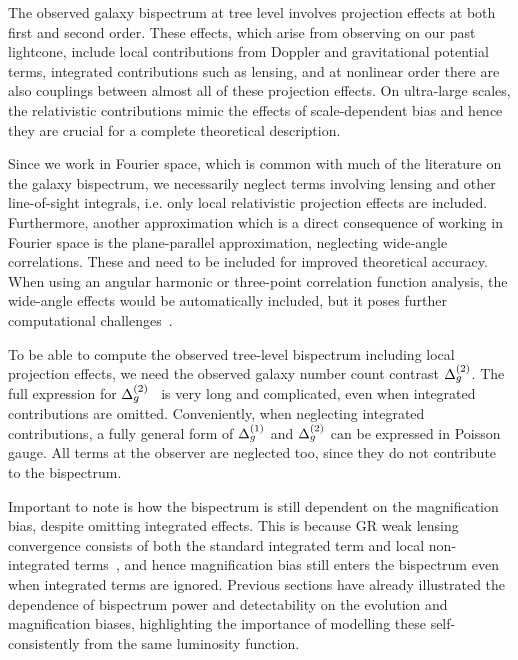 The observed galaxy bispectrum at tree level involves projection effects at both first and second order. These effects, which arise from observing on our past lightcone, include local contributions from Doppler and gravitational potential terms, integrated contributions such as lensing, and at nonlinear order there are also couplings between almost all of these projection effects. On ultra-large scales, the relativistic contributions mimic the effects of scale-dependent bias and hence they are crucial for a complete theoretical description. 

Since we work in Fourier space, which is common with much of the literature on the galaxy bispectrum, we necessarily neglect terms involving lensing and other line-of-sight integrals, i.e. only local relativistic projection effects are included. Furthermore, another approximation which is a direct consequence of working in Fourier space is the plane-parallel approximation, neglecting wide-angle correlations. These and need to be included for improved theoretical accuracy. When using an angular harmonic or three-point correlation function analysis, the wide-angle effects would be automatically included, but it poses further computational challenges~\cite{Bertacca:2017dzm}. 

To be able to compute the observed tree-level bispectrum including local projection effects, we need the observed galaxy number count contrast $\Delta_g^{(2)}$. The full expression for $\Delta_g^{(2)}$~\cite{Bertacca:2014dra,Bertacca:2014wga,Bertacca:2014hwa,Yoo:2014sfa,DiDio:2014lka} is very long and complicated, even when integrated contributions are omitted. Conveniently, when neglecting integrated contributions, a fully general form of $\Delta_g^{(1)}$ and $\Delta_g^{(2)}$ can be expressed in Poisson gauge. All terms at the observer are neglected too, since they do not contribute to the bispectrum. 

Important to note is how the bispectrum is still dependent on the magnification bias, despite omitting integrated effects. This is because GR weak lensing convergence consists of both the standard integrated term and local non-integrated terms~\cite{Bonvin:2008ni}, and hence magnification bias still enters the bispectrum even when integrated terms are ignored. Previous sections have already illustrated the dependence of bispectrum power and detectability on the evolution and magnification biases, highlighting the importance of modelling these self-consistently from the same luminosity function.

